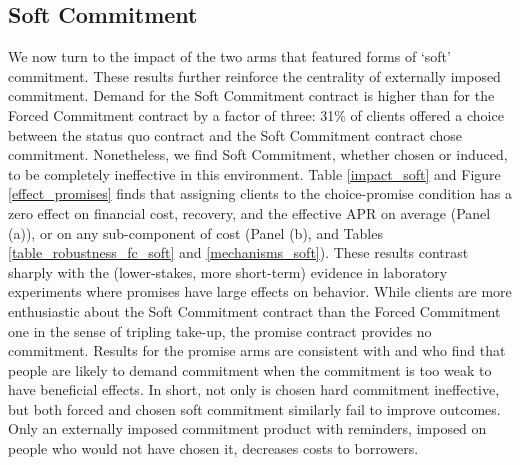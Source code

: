 \documentclass[oneside,11pt]{article}
\begin{document}
\subsection{Soft Commitment}

We now turn to the impact of the two arms that featured forms of `soft' commitment.  These results further reinforce the centrality of externally imposed commitment. 
Demand for the Soft Commitment contract  is higher than for the Forced Commitment contract by a factor of three: {31}\% of clients offered a choice between the status quo contract and the Soft Commitment contract chose commitment.  %
Nonetheless, we find Soft Commitment, whether chosen or induced, to be completely ineffective in this environment.  Table \ref{impact_soft} and  Figure \ref{effect_promises} finds that assigning clients to the choice-promise condition has a zero effect on financial cost, recovery, and the effective APR on average (Panel (a)), or on any sub-component of cost (Panel (b), and Tables \ref{table_robustness_fc_soft} and \ref{mechanisms_soft}). These results contrast sharply with the (lower-stakes, more short-term) evidence in laboratory experiments where promises have large effects on behavior. While clients are more enthusiastic about the Soft Commitment contract than the Forced Commitment one in the sense of tripling take-up, the promise contract provides no commitment. Results for the promise arms are consistent with \cite{Ted} and \cite{John} who find that people are likely to demand commitment when the commitment is too weak to have beneficial effects.  In short, not only is chosen hard commitment ineffective, but both forced and chosen soft commitment similarly fail to improve outcomes.  Only an externally imposed commitment product with reminders, imposed on people who would not have chosen it, decreases costs to borrowers.
   
\end{document}
